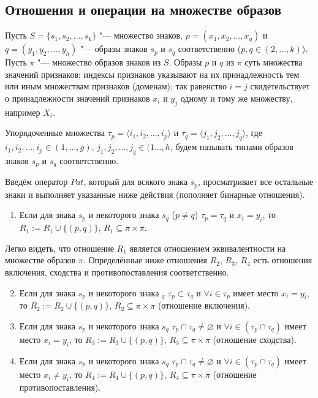 \subsection{Отношения и операции на множестве образов}\label{subsect_2_3_1}

Пусть $S=\{s_1,s_2,\dots,s_k\}$ "--- множество знаков, $p=(x_1,x_2,\dots,x_g)$ и $q=(y_1,y_2,\dots,y_h)$ "--- образы знаков $s_p$ и $s_q$ соответственно ($p,q\in(2,\dots,k)$).
Пусть $\pi$ "--- множество образов знаков из $S$. Образы $p$ и $q$ из $\pi$ суть множества значений признаков; индексы признаков указывают на их принадлежность тем или иным множествам признаков (доменам); так равенство $i=j$ свидетельствует о принадлежности значений признаков $x_i$ и $y_j$ одному и тому же множеству, например $X_i$.

Упорядоченные множества $\tau_p=\langle i_1,i_2,\dots,i_p\rangle$ и $\tau_q=\langle j_1,j_2,\dots,j_q\rangle$, где $i_1,i_2,\dots,i_p\in(1,\dots,g)$, $j_1,j_2,\dots,j_q\in(1\dots,h$, будем называть типами образов знаков $s_p$ и $s_q$ соответственно.

Введём оператор $Pat$, который для всякого знака $s_p$, просматривает все остальные знаки и выполняет указанные ниже действия (пополняет бинарные отношения).
\begin{enumerate}
	\renewcommand\labelenumi{\theenumi.}
	\item Если для знака $s_p$ и некоторого знака $s_q$ ($p\not =q$) $\tau_p=\tau_q$ и $x_i=y_i$, то $R_1:=R_1\cup\{(p,q)\}$, $R_1\subseteq\pi\times\pi$.
\end{enumerate}
Легко видеть, что отношение $R_1$ является отношением эквивалентности на множестве образов $\pi$. Определённые ниже отношения $R_2$, $R_3$, $R_4$ есть отношения включения, сходства и противопоставления соответственно.
\begin{enumerate}
	\setcounter{enumi}{1}
	\renewcommand\labelenumi{\theenumi.}
	\item Если для знака $s_p$ и некоторого знака $_q$ $\tau_p\subset\tau_q$ и $\forall i\in\tau_p$ имеет место $x_i=y_i$, то $R_2:=R_2\cup\{(p,q)\}$, $R_2\subseteq\pi\times\pi$ (отношение включения).
	\item Если для знака $s_p$ и некоторого знака $s_q$ $\tau_p\cap\tau_q\not =\varnothing$ и $\forall i\in(\tau_p\cap\tau_q)$ имеет место $x_i=y_i$, то $R_3:=R_3\cup\{(p,q)\}$, $R_3\subseteq\pi\times\pi$ (отношение сходства).
	\item Если для знака $s_p$ и некоторого знака $s_q$ $\tau_p\cap\tau_q\not =\varnothing$ и $\forall i\in(\tau_p\cap\tau_q)$ имеет место $x_i\not =y_i$, то $R_4:=R_4\cup\{(p,q)\}$, $R_4\subseteq\pi\times\pi$ (отношение противопоставления).
\end{enumerate}

